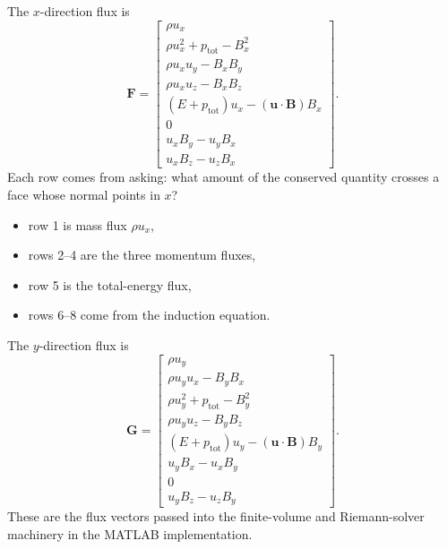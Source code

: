 \documentclass[11pt]{article}
\newcommand{\uvec}{\mathbf{u}}
\newcommand{\Bvec}{\mathbf{B}}
\newcommand{\Fvec}{\mathbf{F}}
\newcommand{\Gvec}{\mathbf{G}}
\newcommand{\ptot}{p_{\mathrm{tot}}}
\begin{document}
The $x$-direction flux is
\begin{equation}
\Fvec =
\begin{bmatrix}
\rho u_x \\
\rho u_x^2 + \ptot - B_x^2 \\
\rho u_xu_y - B_xB_y \\
\rho u_xu_z - B_xB_z \\
(E+\ptot)u_x - (\uvec\cdot\Bvec)B_x \\
0 \\
u_xB_y-u_yB_x \\
u_xB_z-u_zB_x
\end{bmatrix}.
\label{eq:Fx}
\end{equation}
Each row comes from asking: what amount of the conserved quantity crosses a face whose normal points in $x$?
\begin{itemize}[leftmargin=1.8em]
    \item row 1 is mass flux $\rho u_x$,
    \item rows 2--4 are the three momentum fluxes,
    \item row 5 is the total-energy flux,
    \item rows 6--8 come from the induction equation.
\end{itemize}

The $y$-direction flux is
\begin{equation}
\Gvec =
\begin{bmatrix}
\rho u_y \\
\rho u_yu_x - B_yB_x \\
\rho u_y^2 + \ptot - B_y^2 \\
\rho u_yu_z - B_yB_z \\
(E+\ptot)u_y - (\uvec\cdot\Bvec)B_y \\
u_yB_x-u_xB_y \\
0 \\
u_yB_z-u_zB_y
\end{bmatrix}.
\label{eq:Gy}
\end{equation}
These are the flux vectors passed into the finite-volume and Riemann-solver machinery in the MATLAB implementation.
\end{document}
